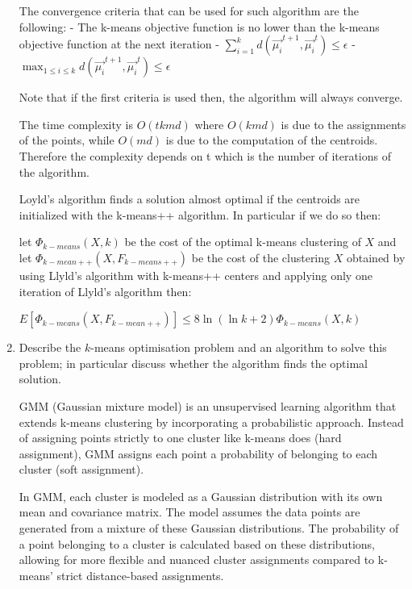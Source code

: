 \documentclass[a4paper,11pt,oneside]{book}
\begin{document}
\begin{enumerate}
\begin{solution}
                The convergence criteria that can be used for such algorithm are the following:
                - The k-means objective function is no lower than the k-means objective function at the next iteration
                - $\sum_{i=1}^k d(\vec{\mu_i}^{t+1},\vec{\mu_i}^t) \leq \epsilon$
                - $\max_{1\leq i\leq k} d(\vec{\mu_i}^{t+1},\vec{\mu_i}^t) \leq \epsilon$
                
                Note that if the first criteria is used then, the algorithm will always converge.
                
                The time complexity is $O(tkmd)$ where $O(kmd)$ is due to the assignments of the points, while $O(md)$ is due to the computation of the centroids. Therefore the complexity depends on t which is the number of iterations of the algorithm.
                
                Loyld's algorithm finds a solution almost optimal if the centroids are initialized with the k-means++ algorithm. In particular if we do so then:
                
                let $\Phi_{k-means}(X,k)$ be the cost of the optimal k-means clustering of $X$ and let $\Phi_{k-mean ++}(X,F_{k-means++})$ be the cost of the clustering $X$ obtained by using Llyld's algorithm with k-means++ centers and applying only one iteration of Llyld's algorithm then:
                
                $E[\Phi_{k-means}(X,F_{k-mean ++})] \leq 8 \ln (\ln k + 2)\Phi_{k-means}(X,k)$
            \end{solution}
        \item Describe the $k$-means optimisation problem and an algorithm to solve this problem; in particular discuss whether the algorithm finds the optimal solution.
            \begin{solution}
                GMM (Gaussian mixture model) is an unsupervised learning algorithm that extends k-means clustering by incorporating a probabilistic approach. Instead of assigning points strictly to one cluster like k-means does (hard assignment), GMM assigns each point a probability of belonging to each cluster (soft assignment).
                
                In GMM, each cluster is modeled as a Gaussian distribution with its own mean and covariance matrix. The model assumes the data points are generated from a mixture of these Gaussian distributions. The probability of a point belonging to a cluster is calculated based on these distributions, allowing for more flexible and nuanced cluster assignments compared to k-means' strict distance-based assignments.
                

\end{solution}
\end{enumerate}
\end{document}
